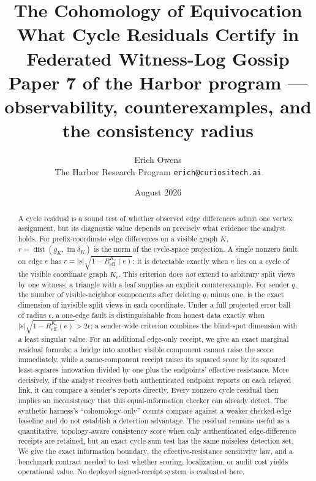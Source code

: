 \documentclass[11pt,a4paper]{article}
\title{\textbf{The Cohomology of Equivocation}\\[4pt]
\large What Cycle Residuals Certify in Federated Witness-Log Gossip\\[3pt]
\normalsize Paper 7 of the Harbor program --- observability, counterexamples, and the consistency radius}
\author{Erich Owens\\ \normalsize The Harbor Research Program \quad \texttt{erich@curiositech.ai}}
\date{August 2026}
\begin{document}
\maketitle

\begin{abstract}
\noindent A cycle residual is a sound test of whether observed edge differences admit one vertex assignment, but its
diagnostic value depends on precisely what evidence the analyst holds. For prefix-coordinate edge differences on a visible
graph $K$, $r=\operatorname{dist}(g_K,\operatorname{im}\delta_K)$ is the norm of the cycle-space projection. A single
nonzero fault on edge $e$ has $r=|s|\sqrt{1-R^{K_c}_{\mathrm{eff}}(e)}$: it is detectable exactly when $e$ lies on a
cycle of the visible coordinate graph $K_c$. This criterion does \emph{not} extend to arbitrary split views by one
witness; a triangle with a leaf supplies an explicit counterexample. For sender $q$, the number of visible-neighbor
components after deleting $q$, minus one, is the exact dimension of invisible split views in each coordinate.
Under a full projected error ball of radius $\epsilon$, a one-edge fault is distinguishable from honest data exactly
when $|s|\sqrt{1-R^{K_c}_{\mathrm{eff}}(e)}>2\epsilon$; a sender-wide criterion combines the blind-spot dimension
with a least singular value.
For an additional edge-only receipt, we give an exact marginal residual formula: a bridge into another
visible component cannot raise the score immediately, while a same-component receipt raises its squared score by
its squared least-squares innovation divided by one plus the endpoints' effective resistance.
More decisively, if the analyst receives both
authenticated endpoint reports on each relayed link, it can compare a sender's reports directly. Every nonzero cycle
residual then implies an inconsistency that this equal-information checker can already detect. The synthetic harness's
``cohomology-only'' counts compare against a weaker checked-edge baseline and do not establish a detection advantage.
The residual remains useful as a quantitative, topology-aware consistency score when only authenticated edge-difference
receipts are retained, but an exact cycle-sum test has the same noiseless detection set. We give the exact information
boundary, the effective-resistance sensitivity law, and a benchmark contract needed to test whether scoring, localization,
or audit cost yields operational value. No deployed signed-receipt system is evaluated here.
\end{abstract}
\end{document}
